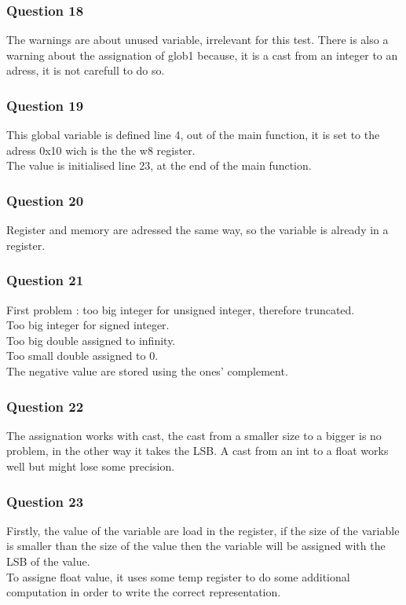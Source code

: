 \documentclass[a4paper,10pt]{article}
\begin{document}
\subsubsection*{Question 18}
The warnings are about unused variable, irrelevant for this test. There is also a warning about the assignation of glob1 because, it is a cast from an integer to an adress, it is not carefull to do so.

\subsubsection*{Question 19}
This global variable is defined line 4, out of the main function, it is set to the adress 0x10 wich is the the w8 register.\\
The value is initialised line 23, at the end of the main function.

\subsubsection*{Question 20}
Register and memory are adressed the same way, so the variable is already in a register.

\subsubsection*{Question 21}
First problem : too big integer for unsigned integer, therefore truncated.\\
Too big integer for signed integer.\\
Too big double assigned to infinity.\\
Too small double assigned to 0.\\
The negative value are stored using the ones' complement.

\subsubsection*{Question 22}
The assignation works with cast, the cast from a smaller size to a bigger is no problem, in the other way it takes the LSB. A cast from an int to a float works well but might lose some precision.

\subsubsection*{Question 23}
Firstly, the value of the variable are load in the register, if the size of the variable is smaller than the size of the value then the variable will be assigned with the LSB of the value.\\
To assigne float value, it uses some temp register to do some additional computation in order to write the correct representation.
\end{document}
